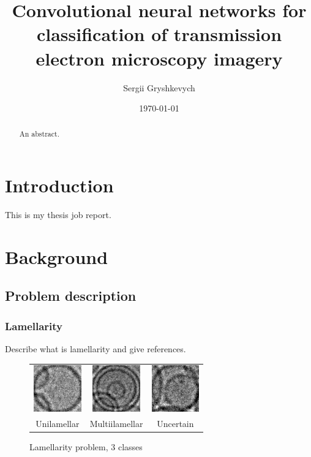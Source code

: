 \documentclass[a4paper, 11pt, table]{article}
\title{Convolutional neural networks for classification of transmission electron microscopy imagery}
\author{Sergii Gryshkevych}
\date{\today}
\begin{document}
\maketitle

\tableofcontents

\begin{abstract}
An abstract.
\end{abstract}

\section{Introduction}
This is my thesis job report. 

\section{Background}

\subsection{Problem description}

\subsubsection{Lamellarity}
Describe what is lamellarity and give references.
\begin{figure}[H]
\centering
\begin{tabular}{ccc}
	\includegraphics[height=2cm, keepaspectratio]{problem_description/lamellarity/uni} & \includegraphics[height=2cm, keepaspectratio]{problem_description/lamellarity/multi} & \includegraphics[height=2cm, keepaspectratio]{problem_description/lamellarity/uncertain} \\
	Unilamellar & Multiilamellar & Uncertain \\[6pt]
\end{tabular}
\caption{Lamellarity problem, 3 classes}
\end{figure}
\end{document}
